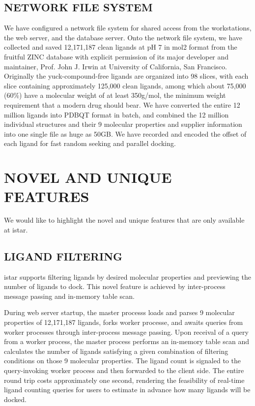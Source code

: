 \documentclass[12pt]{article}
\begin{document}
\subsection*{\sffamily \large NETWORK FILE SYSTEM}

We have configured a network file system for shared access from the workstations, the web server, and the database server. Onto the network file system, we have collected and saved 12,171,187 clean ligands at pH 7 in mol2 format from the fruitful ZINC database \citep{532,1178} with explicit permission of its major developer and maintainer, Prof. John J. Irwin at University of California, San Francisco. Originally the yuck-compound-free ligands are organized into 98 slices, with each slice containing approximately 125,000 clean ligands, among which about 75,000 (60\%) have a molecular weight of at least 350g/mol, the minimum weight requirement that a modern drug should bear. We have converted the entire 12 million ligands into PDBQT format in batch, and combined the 12 million individual structures and their 9 molecular properties and supplier information into one single file as huge as 50GB. We have recorded and encoded the offset of each ligand for fast random seeking and parallel docking.

\section*{\sffamily \Large NOVEL AND UNIQUE FEATURES}

We would like to highlight the novel and unique features that are only available at istar.

\subsection*{\sffamily \large LIGAND FILTERING}

istar supports filtering ligands by desired molecular properties and previewing the number of ligands to dock. This novel feature is achieved by inter-process message passing and in-memory table scan.

During web server startup, the master processs loads and parses 9 molecular properties of 12,171,187 ligands, forks worker processe, and awaits queries from worker processes through inter-process message passing. Upon receival of a query from a worker process, the master process performs an in-memory table scan and calculates the number of ligands satisfying a given combination of filtering conditions on those 9 molecular properties. The ligand count is signaled to the query-invoking worker process and then forwarded to the client side. The entire round trip costs approximately one second, rendering the feasibility of real-time ligand counting queries for users to estimate in advance how many ligands will be docked.
\end{document}
